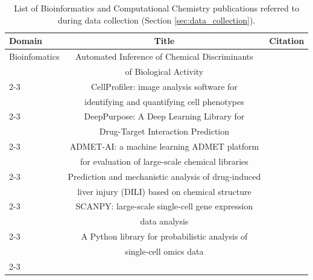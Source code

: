 \begin{table}[ht]
\scriptsize
\centering
\caption{List of Bioinformatics and Computational Chemistry publications referred to during data collection (Section \ref{sec:data_collection}).}
\begin{tabular}{lcc}
\toprule
\textbf{Domain} & \textbf{Title} & \textbf{Citation}\\
\midrule

\multirow{23.5}{*}{Bioinfomatics} & Automated Inference of Chemical Discriminants & \multirow{2}{*}{\citet{Raschka2018}} \\
 & of Biological Activity & \\
\cmidrule(lr){2-3}

 & CellProfiler: image analysis software for  & \multirow{2}{*}{\citet{Carpenter2006}} \\
 & identifying and quantifying cell phenotypes & \\
\cmidrule(lr){2-3}

 & DeepPurpose: A Deep Learning Library for & \multirow{2}{*}{\citet{huang2020deeppurpose}} \\
 & Drug-Target Interaction Prediction & \\
\cmidrule(lr){2-3}

 & ADMET-AI: a machine learning ADMET platform & \multirow{2}{*}{\citet{10.1093/bioinformatics/btae416}} \\
 & for evaluation of large-scale chemical libraries & \\
\cmidrule(lr){2-3}

 & Prediction and mechanistic analysis of drug-induced & \multirow{2}{*}{\citet{Liu2021}} \\
 & liver injury (DILI) based on chemical structure & \\
\cmidrule(lr){2-3}

 & SCANPY: large-scale single-cell gene expression & \multirow{2}{*}{\citet{Wolf2018}} \\
 &  data analysis & \\
\cmidrule(lr){2-3}

 & A Python library for probabilistic analysis of & \multirow{2}{*}{\citet{Gayoso2022}} \\
 & single-cell omics data & \\
\cmidrule(lr){2-3}


\end{tabular}
\end{table}
